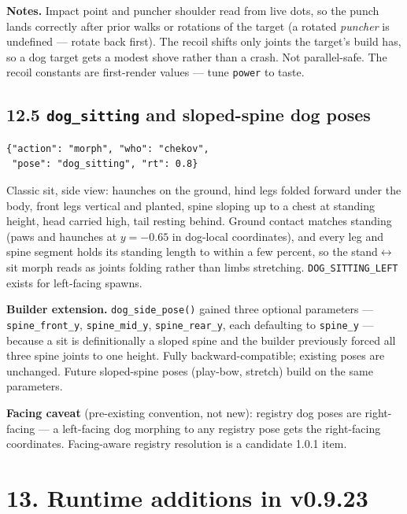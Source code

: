 \documentclass[
  12pt,
  letterpaper,
]{book}
\begin{document}
\textbf{Notes.} Impact point and puncher shoulder read from live
dots, so the punch lands correctly after prior walks or rotations of
the target (a rotated \emph{puncher} is undefined --- rotate back
first). The recoil shifts only joints the target's build has, so a
dog target gets a modest shove rather than a crash. Not
parallel-safe. The recoil constants are first-render values ---
tune \texttt{power} to taste.

\subsection{\texorpdfstring{12.5 \texttt{dog\_sitting} and sloped-spine
dog poses}{12.5 dog\_sitting and sloped-spine dog poses}}\label{dog-sitting}

\begin{verbatim}
{"action": "morph", "who": "chekov",
 "pose": "dog_sitting", "rt": 0.8}
\end{verbatim}

Classic sit, side view: haunches on the ground, hind legs folded
forward under the body, front legs vertical and planted, spine
sloping up to a chest at standing height, head carried high, tail
resting behind. Ground contact matches standing (paws and haunches
at $y = -0.65$ in dog-local coordinates), and every leg and spine
segment holds its standing length to within a few percent, so the
stand$\leftrightarrow$sit morph reads as joints folding rather than
limbs stretching. \texttt{DOG\_SITTING\_LEFT} exists for left-facing
spawns.

\textbf{Builder extension.} \texttt{dog\_side\_pose()} gained three
optional parameters --- \texttt{spine\_front\_y},
\texttt{spine\_mid\_y}, \texttt{spine\_rear\_y}, each defaulting to
\texttt{spine\_y} --- because a sit is definitionally a sloped spine
and the builder previously forced all three spine joints to one
height. Fully backward-compatible; existing poses are unchanged.
Future sloped-spine poses (play-bow, stretch) build on the same
parameters.

\textbf{Facing caveat} (pre-existing convention, not new): registry
dog poses are right-facing --- a left-facing dog morphing to any
registry pose gets the right-facing coordinates. Facing-aware
registry resolution is a candidate 1.0.1 item.

\section{13. Runtime additions in
v0.9.23}\label{runtime-additions-in-v0.9.23}
\end{document}
